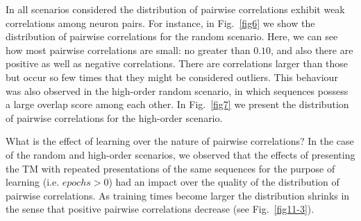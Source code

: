 \documentclass[11pt,letterpaper]{article}
\begin{document}
            In all scenarios considered the distribution of pairwise correlations exhibit weak correlations among neuron pairs.
            For instance, in Fig.~\ref{fig6} we show the distribution of pairwise correlations for the random scenario.
            Here, we can see how most pairwise correlations are small: no greater than $0.10$, and also there are positive as
            well as negative correlations.
            There are correlations larger than those but occur so few times that they might be considered outliers.
            This behaviour was also observed in the high-order random scenario, in which sequences possess a large overlap score
            among each other.
            In Fig.~\ref{fig7} we present the distribution of pairwise correlations for the high-order scenario.
            
            What is the effect of learning over the nature of pairwise correlations?
            In the case of the random and high-order scenarios, we observed that the effects of presenting the 
            TM with repeated presentations of the same sequences for the purpose of learning (i.e. $epochs>0$)
            had an impact over the quality of the distribution of pairwise correlations.
            As training times become larger the distribution shrinks in the sense that positive pairwise correlations
            decrease (see Fig.~\ref{fig11-3}).
          
\end{document}
